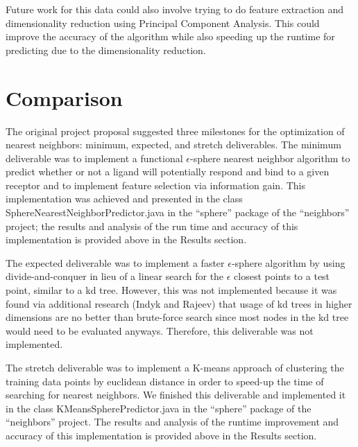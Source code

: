 \documentclass[11pt,letterpaper]{article}
\begin{document}
Future work for this data could also involve trying to do feature extraction and dimensionality reduction using Principal Component Analysis.  This could improve the accuracy of the algorithm while also speeding up the runtime for predicting due to the dimensionality reduction.  

\section{Comparison}

The original project proposal suggested three milestones for the optimization of nearest neighbors: minimum, expected, and stretch deliverables. The minimum deliverable was to implement a functional $\epsilon$-sphere nearest neighbor algorithm to predict whether or not a ligand will potentially respond and bind to a given receptor and to implement feature selection via information gain. This implementation was achieved and presented in the class SphereNearestNeighborPredictor.java in the ``sphere'' package of the ``neighbors'' project; the results and analysis of the run time and accuracy of this implementation is provided above in the Results section.

The expected deliverable was to implement a faster $\epsilon$-sphere algorithm by using divide-and-conquer in lieu of a linear search for the $\epsilon$ closest points to a test point, similar to a kd tree. However, this was not implemented because it was found via additional research (Indyk and Rajeev) that usage of kd trees in higher dimensions are no better than brute-force search since most nodes in the kd tree would need to be evaluated anyways. Therefore, this deliverable was not implemented.

The stretch deliverable was to implement a K-means approach of clustering the training data points by euclidean distance in order to speed-up the time of searching for nearest neighbors.  We finished this deliverable and implemented it in the class KMeansSpherePredictor.java in the ``sphere'' package of the ``neighbors'' project. The results and analysis of the runtime improvement and accuracy of this implementation is provided above in the Results section.
\end{document}
